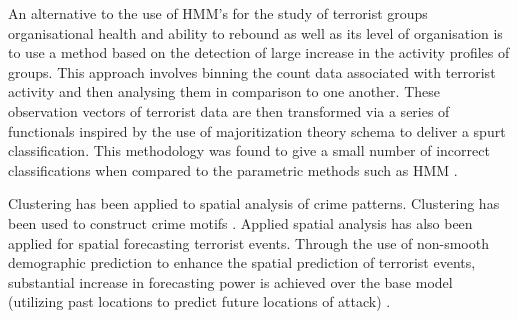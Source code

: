 An alternative to the use of HMM's for the study of terrorist groups organisational health and ability to rebound as well as its level of organisation is to use a method based on the detection of large increase in the activity profiles of groups. This approach involves binning the count data associated with terrorist activity and then analysing  them in comparison to one another. These observation vectors of terrorist data are then transformed via a series of functionals inspired by the use of majoritization theory schema to deliver a spurt classification. This methodology was found to give a small number of incorrect classifications when compared to the parametric methods such as HMM \citep{raghavan2016tracking}. 

Clustering has been applied to spatial analysis of crime patterns. Clustering has been used to construct crime motifs \citep{nath2006crime}. Applied spatial analysis has also been applied for spatial forecasting terrorist events. Through the use of non-smooth demographic prediction to enhance the spatial prediction of terrorist events, substantial  increase in forecasting power is achieved over the base model (utilizing past locations to predict future locations of attack) \citep{brown2004spatial}.

